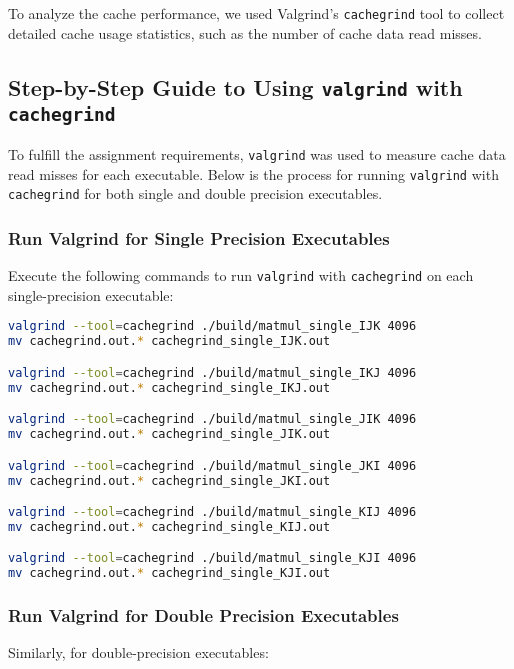 \documentclass[12pt]{article}
\begin{document}
To analyze the cache performance, we used Valgrind's \texttt{cachegrind} tool to collect detailed cache usage statistics, such as the number of cache data read misses.

\subsection{Step-by-Step Guide to Using \texttt{valgrind} with \texttt{cachegrind}}

To fulfill the assignment requirements, \texttt{valgrind} was used to measure cache data read misses for each executable. Below is the process for running \texttt{valgrind} with \texttt{cachegrind} for both single and double precision executables.

\subsubsection{Run Valgrind for Single Precision Executables}

Execute the following commands to run \texttt{valgrind} with \texttt{cachegrind} on each single-precision executable:

\begin{lstlisting}[language=bash]
valgrind --tool=cachegrind ./build/matmul_single_IJK 4096
mv cachegrind.out.* cachegrind_single_IJK.out

valgrind --tool=cachegrind ./build/matmul_single_IKJ 4096
mv cachegrind.out.* cachegrind_single_IKJ.out

valgrind --tool=cachegrind ./build/matmul_single_JIK 4096
mv cachegrind.out.* cachegrind_single_JIK.out

valgrind --tool=cachegrind ./build/matmul_single_JKI 4096
mv cachegrind.out.* cachegrind_single_JKI.out

valgrind --tool=cachegrind ./build/matmul_single_KIJ 4096
mv cachegrind.out.* cachegrind_single_KIJ.out

valgrind --tool=cachegrind ./build/matmul_single_KJI 4096
mv cachegrind.out.* cachegrind_single_KJI.out
\end{lstlisting}

\subsubsection{Run Valgrind for Double Precision Executables}

Similarly, for double-precision executables:
\end{document}

